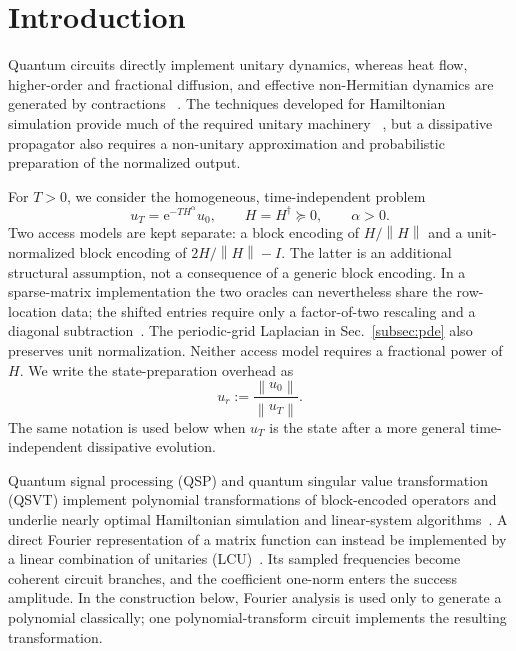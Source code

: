 \documentclass[aps,pra,reprint,floatfix,unsortedaddress,superscriptaddress]{revtex4-2}
\newcommand{\norm}[1]{\left\lVert#1\right\rVert}
\begin{document}
\maketitle

\section{Introduction}
\label{sec:introduction}

Quantum circuits directly implement unitary dynamics, whereas heat
flow, higher-order and fractional diffusion, and effective
non-Hermitian dynamics are generated by contractions
~\cite{Linden2022,PhysRevA.108.032603,METZLER20001,LISCHKE2020109009}.
The techniques developed for Hamiltonian simulation provide much of
the required unitary machinery
~\cite{doi:10.1126/science.273.5278.1073,RevModPhys.86.153,
doi:10.1073/pnas.1801723115,Altman2021qsim,daley2022practical}, but a
dissipative propagator also requires a non-unitary approximation and
probabilistic preparation of the normalized output.

For $T>0$, we consider the homogeneous, time-independent problem
\begin{equation}
    u_T=\mathrm e^{-T H^\alpha}u_0,
    \qquad
    H=H^\dagger\succeq0,
    \qquad
    \alpha>0.
    \label{eq:intro_problem}
\end{equation}
Two access models are kept separate: a block encoding of
$H/\norm{H}$ and a unit-normalized block encoding of
$2H/\norm{H}-I$.  The latter is an additional structural assumption,
not a consequence of a generic block encoding.  In a sparse-matrix
implementation the two oracles can nevertheless share the row-location
data; the shifted entries require only a factor-of-two rescaling and a
diagonal subtraction~\cite{Berry2007,Sunderhauf2024blockencoding}.
The periodic-grid Laplacian in
Sec.~\ref{subsec:pde} also preserves unit normalization.
Neither access model requires a fractional power of $H$.  We write the
state-preparation overhead as
\begin{equation}
    u_r:=
    \frac{\norm{u_0}}{\norm{u_T}}.
    \label{eq:intro_output_ratio}
\end{equation}
The same notation is used below when $u_T$ is the state after a more
general time-independent dissipative evolution.

Quantum signal processing (QSP) and quantum singular value transformation
(QSVT) implement polynomial transformations of block-encoded
operators and underlie nearly optimal Hamiltonian simulation and
linear-system
algorithms~\cite{PhysRevLett.118.010501,Gilyen2019qsvt,
PhysRevLett.114.090502,
PhysRevLett.103.150502,doi:10.1137/16M1087072,
Low2026quantumlinearsystem}.
A direct Fourier representation of a matrix function can instead be
implemented by a linear combination of unitaries
(LCU)~\cite{Childs2012lcu}.  Its sampled frequencies become coherent
circuit branches, and the coefficient one-norm enters the success
amplitude.  In the construction below, Fourier analysis is used only
to generate a polynomial classically; one polynomial-transform circuit
implements the resulting transformation.
\end{document}
